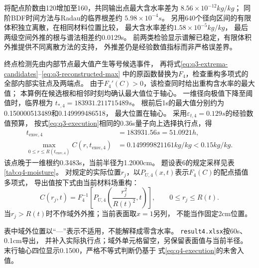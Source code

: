 将配点阶数由120增加至160，共同输出点最大含水率差为
$8.56\times10^{-12}\unit{kg/kg}$；
同阶BDF时间方法与Radau的临界根差约
$5.98\times10^{-4}\unit{s}$。
另用640个径向区间的有限体积独立离散，在相同材料位置比较，
最大含水率差约$1.58\times10^{-5}\unit{kg/kg}$，
最后两级空间外推的根与谱法相差约0.0129\unit{s}。
前两类检验显示谱解已稳定，有限体积外推提供不同离散方法的支持，
外推差仍是经验数值指标而非严格误差界。

终点检测先由内部节点最大值产生等号候选事件，
再将式\eqref{eq:q3-extrema-candidates}--\eqref{eq:q3-reconstructed-max}
中的原函数替换为$F_4$，检查重构多项式的全部内部实驻点及两端点。
由于$F_4'(C)>0$，该检查同时给出重构含水率的最大值；
本算例在候选根和相邻时刻均确认最大值位于轴心。
一维径向极值下降至阈值时，临界根为
$t_{*,4}=183931.211715489\unit{s}$。
根前后1\unit{s}的最大值分别约为0.150000513489和0.149999486518，
最大位置在轴心。
采用$\varepsilon_{t,4}=0.129\unit{s}$的经验数值预算，
按式\eqref{eq:q3-execution}相同的0.36\unit{s}量子向上选择执行点，得
\begin{equation}
 \begin{aligned}
  t_{\mathrm{exec},4}&=183931.56\unit{s}
      =\boxed{51.0921\unit{h}},\\
  \max_{0\le r\le R(t_{\mathrm{exec},4})}C(r,t_{\mathrm{exec},4})
      &=0.149999821161\unit{kg/kg}<0.15\unit{kg/kg}.
 \end{aligned}
 \label{eq:q4-execution}
\end{equation}
该点晚于一维根约0.3483\unit{s}，当前半径为1.2000\unit{cm}。
题设表6的规定采样见表\ref{tab:q4-moisture}。
对规定的实际位置$r_j$，以$P_{U,4}(x,t)$表示$F_4(C)$的配点插值多项式，
导出值按下式由当前材料场重构：
\begin{equation}
 C(r_j,t)=F_4^{-1}\!\left[
 P_{U,4}\!\left(\frac{r_j^2}{R(t)^2},t\right)\right],
 \qquad 0\le r_j\le R(t).
 \label{eq:q4-output-map}
\end{equation}
当$r_j>R(t)$时不作域外外推；当前表面取$x=1$另列，
不能当作固定2\unit{cm}位置。

\begin{table}[htbp]
 \centering
 \caption{题设表6：收缩过程中的干基含水率（\unit{kg/kg}）}
 \label{tab:q4-moisture}
 \small
 
\end{table}

表中域外位置以“—”表示不适用，不能解释成零含水率。
\texttt{result4.xlsx}按60\unit{s}、0.1\unit{cm}导出，
并补入实际执行点；域外单元格留空，另保留表面值与当前半径。
末行轴心四位显示0.1500，严格不等式判断仍基于
式\eqref{eq:q4-execution}的未舍入值。

